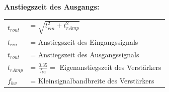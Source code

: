 			{\bf Anstiegszeit des Ausgangs:} \\
			\begin{tabular}{ll}
				$t_{rout}$ & = $\sqrt{t_{rin}^2 + t_{rAmp}^2}$ \\
				$t_{rin}$  & = Anstiegszeit des Eingangssignals \\
				$t_{rout}$ & = Anstiegszeit des Ausgangssignals \\
				$t_{rAmp}$ & = $\frac{0.35}{f_{bw}} = $ Eigenanstiegszeit des Verstärkers \\
				$f_{bw}$   & = Kleinsignalbandbreite des Verstärkers \\
			\end{tabular}

